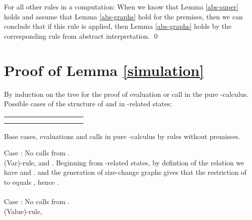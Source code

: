 \documentclass{LMCS}
\newcommand{\fl}{\noindent}
\newcommand{\bt}{\begin{tabular}}
\newcommand{\et}{\end{tabular}}
\newcommand{\bprf}{\proof}
\newcommand{\eprf}{\qed}
\theoremstyle{definition}\newtheorem{env}[thm]{Environment}
\begin{document}
For all other rules in a computation: When we know that 
Lemma \ref{abs-super} holds and 
assume that Lemma \ref{abs-graphs} hold for the premises, then we 
can conclude that 
if this rule is applied, then Lemma \ref{abs-graphs} holds by the 
corresponding rule from 
abstract interpretation. 
\eprf
\section{Proof of Lemma \ref{simulation}}
\bprf By induction on the tree for the proof of evaluation or call in the pure -calculus.\\
Possible cases of the structure of  and  in -related states:\smallskip

\bt{rlccrlccrl}
&& & &
&& & &
&\\
&& & &
&& & &
&\\
\et
\medskip

Base cases, evaluations and calls in pure -calculus by rules without premisses.
\medskip

Case : No calls from .\\ 
\fl (Var)-rule,  and . Beginning from -related states, by defintion of the relation  we have  and .  and the generation of size-change graphs gives that the restriction of  to  equals , hence . \\
\\
Case : No calls from . \\
(Value)-rule, 
 
\end{document}
